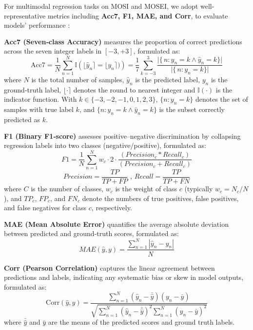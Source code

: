 \documentclass{article}
\begin{document}
For multimodal regression tasks on MOSI and MOSEI, we adopt well-representative metrics including \textbf{Acc7, F1, MAE, and Corr}, to evaluate models' performance \cite{poria2017review}:

\textbf{Acc7 (Seven‐class Accuracy)} measures the proportion of correct predictions across the seven integer labels in $\left[-3, +3\right]$, formulated as:
\begin{equation}
\mathrm{Acc7}
= \frac{1}{N}\sum_{n=1}^{N}
\mathbb{I}\left( \lfloor \hat y_n \rceil = \lfloor y_n \rceil) \right)
=\frac{1}{7}
\sum_{k=-3}^{3}
\frac{\bigl|\{\,n : y_n = k \land \hat y_n = k\}\bigr|}
     {\bigl|\{\,n : y_n = k\}\bigr|}
\end{equation}
where $N$ is the total number of samples, $\hat y_n$ is the predicted label, $y_n$ is the ground‐truth label, $\lfloor \cdot \rceil$ denotes the round to nearest integer and \(\mathbb{I}(\cdot)\) is the indicator function. With $k\in\{-3, -2, -1, 0, 1, 2, 3\}$, $\{n : y_n = k\}$ denotes the set of samples with true label $k$, and $\{n : y_n = k \land \hat y_n = k\}$ is the subset correctly predicted as $k$.

\textbf{F1 (Binary F1‐score)} assesses positive–negative discrimination by collapsing regression labels into two classes (negative/positive), formulated as:
\begin{equation}
F1=\frac{1}{N}\sum_{n=1}^{N} w_c\cdot 2 \cdot \frac{(Precision_c * Recall_c)} {(Precision_c + Recall_c)}
\label{equ_f1}
\end{equation}
\begin{equation}
Precision=\frac{TP}{TP + FP}\text{ ,  } Recall = \frac{TP}{TP + FN}
\end{equation}
where $C$ is the number of classes, $w_c$ is the weight of class $c$ (typically $w_c = N_c / N$), and $TP_c$, $FP_c$, and $FN_c$ denote the numbers of true positives, false positives, and false negatives for class $c$, respectively.

\textbf{MAE (Mean Absolute Error)} quantifies the average absolute deviation between predicted and ground‐truth  scores, formulated as:
\begin{equation}
MAE(\hat{y}, y) = \frac{ {\sum_{n=1}^{N}}\left | \hat{y}_n-y_n \right |  }{N}
\end{equation}

\textbf{Corr (Pearson Correlation)} captures the linear agreement between predictions and labels, indicating any systematic bias or skew in model outputs, formulated as:
\begin{equation}
\text{Corr}(\hat{y}, y)=\frac{ {\textstyle \sum_{n=1}^{N}}\left ( \hat{y}_n-\bar{\hat{y}} \right )\left ( y_n-\bar{y} \right )  }{\sqrt{ {\textstyle \sum_{n=1}^{N}}\left ( \hat{y}_n-\bar{\hat{y}} \right )^2{\textstyle \sum_{n=1}^{N}}\left ( y_n-\bar{y} \right )^2  } }
\end{equation}
where $\bar{\hat{y}}$ and $\bar{y}$ are the means of the predicted scores and ground truth labels.
\end{document}
